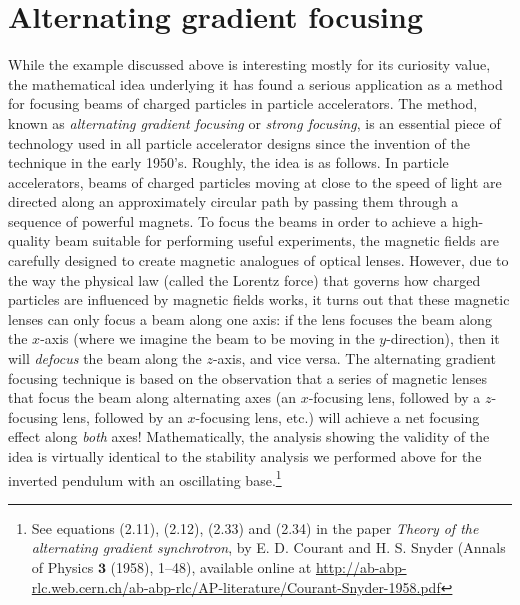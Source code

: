 \documentclass[11pt]{report}
\theoremstyle{plain}
\theoremstyle{definition}
\begin{document}
\section{Alternating gradient focusing}
While the example discussed above is interesting
mostly for its curiosity value, the mathematical idea
underlying it has found a serious application as a
method for focusing beams of charged particles in
particle accelerators. The method, known as
\emph{alternating gradient focusing} or \emph{strong focusing},
is an essential piece of technology used in all
particle accelerator designs since the invention of
the technique in the early 1950's. Roughly, the idea
is as follows. In particle accelerators, beams of
charged particles moving at close to the speed of
light are directed along an approximately circular
path by passing them through a sequence of powerful
magnets. To focus the beams in order to achieve a
high-quality beam suitable for performing useful
experiments, the magnetic fields are carefully
designed to create magnetic analogues of optical
lenses. However, due to the way the physical law
(called the Lorentz force) that governs how charged
particles are influenced by magnetic fields works, it
turns out that these magnetic lenses can only focus a
beam along one axis: if the lens focuses the beam
along the $x$-axis (where we imagine the beam to be
moving in the $y$-direction), then it will \emph{defocus}
the beam along the $z$-axis, and vice versa. The
alternating gradient focusing technique is based on
the observation that a series of magnetic lenses that
focus the beam along alternating axes (an $x$-focusing
lens, followed by a $z$-focusing lens, followed by an
$x$-focusing lens, etc.) will achieve a net focusing
effect along \emph{both} axes! Mathematically, the analysis
showing the validity of the idea is virtually
identical to the stability analysis we performed above
for the inverted pendulum with an oscillating
base.\footnote{See equations (2.11), (2.12), (2.33) and (2.34) in
the paper \emph{Theory of the alternating gradient
synchrotron}, by E. D. Courant and H. S. Snyder
(Annals of Physics $\textbf{3}$ (1958), 1--48),
available online at
\href{http://ab-abp-rlc.web.cern.ch/ab-abp-rlc/AP-literature/Courant-Snyder-1958.pdf}{http://ab-abp-rlc.web.cern.ch/ab-abp-rlc/AP-literature/Courant-Snyder-1958.pdf}}
\end{document}
